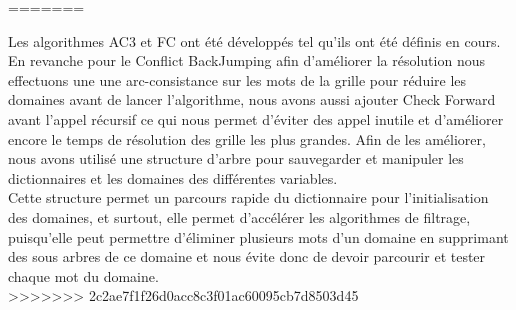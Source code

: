 \documentclass[a4paper,12pt]{report}
\begin{document}
=======
\item Les algorithmes AC3 et FC ont été développés tel qu'ils ont été définis en cours. 
En revanche pour le Conflict BackJumping afin d’améliorer la résolution nous effectuons une une arc-consistance sur les mots de la grille pour réduire les domaines avant de lancer l'algorithme, nous avons aussi ajouter Check Forward avant l'appel récursif ce qui nous permet d'éviter des appel inutile et d'améliorer encore le temps de résolution des grille les plus grandes. Afin de les améliorer, nous avons utilisé une structure d'arbre pour sauvegarder et manipuler les dictionnaires et les domaines des différentes variables.\\
 Cette structure permet un parcours rapide du dictionnaire pour l'initialisation des domaines, et surtout, elle permet d’accélérer les algorithmes de filtrage, puisqu’elle peut permettre d’éliminer plusieurs mots d’un
domaine en supprimant des sous arbres de ce domaine et nous évite donc de devoir parcourir et tester chaque mot du domaine.\\
>>>>>>> 2c2ae7f1f26d0acc8c3f01ac60095cb7d8503d45
\end{document}
